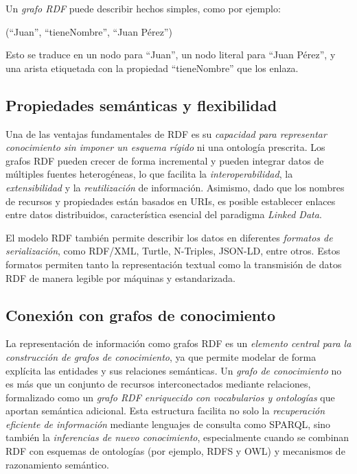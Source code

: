 \documentclass{article}
\begin{document}
Un \textit{grafo RDF} puede describir hechos simples, como por ejemplo:

\begin{center}
    (``Juan'', ``tieneNombre'', ``Juan Pérez'')
\end{center}

Esto se traduce en un nodo para ``Juan'', un nodo literal para ``Juan Pérez'', y una arista etiquetada con la propiedad ``tieneNombre'' que los enlaza.

\subsection{Propiedades semánticas y flexibilidad}

Una de las ventajas fundamentales de RDF es su \textit{capacidad para representar conocimiento sin imponer un esquema rígido} ni una ontología prescrita. Los grafos RDF pueden crecer de forma incremental y pueden integrar datos de múltiples fuentes heterogéneas, lo que facilita la \textit{interoperabilidad}, la \textit{extensibilidad} y la \textit{reutilización} de información. Asimismo, dado que los nombres de recursos y propiedades están basados en URIs, es posible establecer enlaces entre datos distribuidos, característica esencial del paradigma \textit{Linked Data}.

El modelo RDF también permite describir los datos en diferentes \textit{formatos de serialización}, como RDF/XML, Turtle, N-Triples, JSON-LD, entre otros. Estos formatos permiten tanto la representación textual como la transmisión de datos RDF de manera legible por máquinas y estandarizada.

\subsection{Conexión con grafos de conocimiento}

La representación de información como grafos RDF es un \textit{elemento central para la construcción de grafos de conocimiento}, ya que permite modelar de forma explícita las entidades y sus relaciones semánticas. Un \textit{grafo de conocimiento} no es más que un conjunto de recursos interconectados mediante relaciones, formalizado como un \textit{grafo RDF enriquecido con vocabularios y ontologías} que aportan semántica adicional. Esta estructura facilita no solo la \textit{recuperación eficiente de información} mediante lenguajes de consulta como SPARQL, sino también la \textit{inferencias de nuevo conocimiento}, especialmente cuando se combinan RDF con esquemas de ontologías (por ejemplo, RDFS y OWL) y mecanismos de razonamiento semántico.
\end{document}
